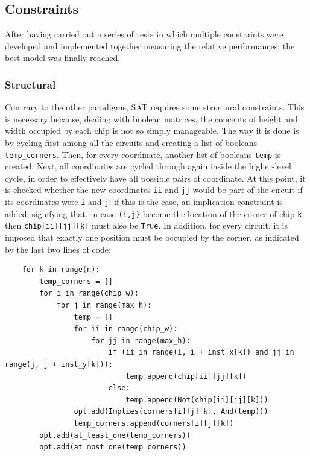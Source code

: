 \documentclass[a4paper, 12pt]{article}
\begin{document}
\subsection{Constraints}

After having carried out a series of tests in which multiple constraints were developed and implemented together measuring the relative performances, the best model was finally reached.


\subsubsection{Structural}

Contrary to the other paradigms, SAT requires some structural constraints. This is necessary because, dealing with boolean matrices, the concepts of height and width occupied by each chip is not so simply manageable. The way it is done is by cycling first among all the circuits and creating a list of booleans \verb|temp_corners|. Then, for every coordinate, another list of booleans \verb|temp| is created. Next, all coordinates are cycled through again inside the higher-level cycle, in order to effectively have all possible pairs of coordinate. At this point, it is checked whether the new coordinates \verb|ii| and \verb|jj| would be part of the circuit if its coordinates were \verb|i| and \verb|j|: if this is the case, an implication constraint is added, signifying that, in case \verb|(i,j)| become the location of the corner of chip \verb|k|, then \verb|chip[ii][jj][k]| must also be \verb|True|. In addition, for every circuit, it is imposed that exactly one position must be occupied by the corner, as indicated by the last two lines of code:
\begin{verbatim}
    for k in range(n):
        temp_corners = []
        for i in range(chip_w):
            for j in range(max_h):
                temp = []
                for ii in range(chip_w):
                    for jj in range(max_h):
                        if (ii in range(i, i + inst_x[k]) and jj in range(j, j + inst_y[k])):
                            temp.append(chip[ii][jj][k])
                        else:
                            temp.append(Not(chip[ii][jj][k]))
                opt.add(Implies(corners[i][j][k], And(temp)))
                temp_corners.append(corners[i][j][k])
        opt.add(at_least_one(temp_corners))
        opt.add(at_most_one(temp_corners))
\end{verbatim}
\end{document}
